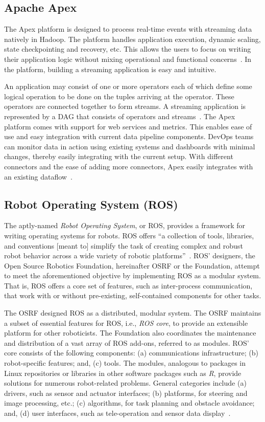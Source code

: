 \subsection{Apache Apex}

The Apex platform is designed to process real-time events with
streaming data natively in Hadoop. The platform handles application
execution, dynamic scaling, state checkpointing and recovery,
etc. This allows the users to focus on writing their application logic
without mixing operational and functional
concerns~\cite{apache-apex}. In the platform, building a streaming
application is easy and intuitive.

An application may consist of one or more operators each of which
define some logical operation to be done on the tuples arriving at the
operator. These operators are connected together to form streams. A
streaming application is represented by a DAG that consists of
operators and streams~\cite{apex-operators}. The Apex platform comes
with support for web services and metrics. This enables ease of use
and easy integration with current data pipeline components. DevOps
teams can monitor data in action using existing systems and dashboards
with minimal changes, thereby easily integrating with the current
setup. With different connectors and the ease of adding more
connectors, Apex easily integrates with an existing
dataflow~\cite{apex-ease}.

\subsection{Robot Operating System (ROS)}

The aptly-named \textit{Robot Operating System}, or ROS, provides a framework
for writing operating systems for robots.  ROS offers ``a collection
of tools, libraries, and conventions [meant to] simplify the task of
creating complex and robust robot behavior across a wide variety of
robotic platforms''~\cite{www-ros-about}. ROS' designers, the Open
Source Robotics Foundation, hereinafter OSRF or the Foundation,
attempt to meet the aforementioned objective by implementing ROS as a
modular system.  That is, ROS offers a core set of features, such as
inter-process communication, that work with or without pre-existing,
self-contained components for other tasks.

The OSRF designed ROS as a distributed, modular system.  The OSRF
maintains a subset of essential features for ROS, i.e., \textit{ROS core}, to
provide an extensible platform for other roboticists.  The Foundation
also coordinates the maintenance and distribution of a vast array of
ROS add-ons, referred to as modules.  ROS' core consists of the
following components: (a) communications infrastructure; (b)
robot-specific features; and, (c) tools.  The modules, analogous to
packages in Linux repositories or libraries in other software packages
such as \textit{R}, provide solutions for numerous robot-related problems.
General categories include (a) drivers, such as sensor and actuator
interfaces; (b) platforms, for steering and image processing, etc.;
(c) algorithms, for task planning and obstacle avoidance; and, (d)
user interfaces, such as tele-operation and sensor data
display~\cite{www-software-categories}.


